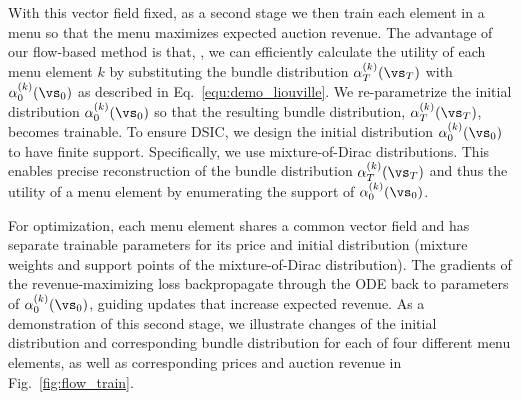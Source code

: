 With this vector field fixed, as a second stage we then train each element in a menu so that the menu maximizes expected auction revenue.  The advantage of our flow-based method is that, , we can efficiently calculate the utility of each menu element $k$ by substituting the bundle distribution $\alpha_T^{(k)}(\vs_T)$ with $\alpha_0^{(k)}(\vs_0)$ as described in Eq.~\ref{equ:demo_liouville}.
We re-parametrize the initial distribution $\alpha_0^{(k)}(\vs_0)$ so that the resulting bundle distribution, $\alpha_T^{(k)}(\vs_T)$, becomes trainable.
To ensure DSIC, we design the initial distribution $\alpha^{(k)}_0(\vs_0)$ to have finite support. Specifically, we use mixture-of-Dirac distributions.
This enables precise reconstruction of the bundle distribution $\alpha_T^{(k)}(\vs_T)$ and thus the utility of a menu element by enumerating the support of $\alpha_0^{(k)}(\vs_0)$.

For optimization, each menu element shares a common vector field and has separate trainable parameters for its price and  initial distribution (mixture weights and support points of the mixture-of-Dirac distribution).  
The gradients of the revenue-maximizing loss backpropagate through the ODE back to parameters of $\alpha_0^{(k)}(\vs_0)$, guiding updates that increase expected revenue. 
As a demonstration of  this second stage, we illustrate changes of the initial distribution and corresponding bundle  distribution for each of four different menu elements, as well as corresponding prices and auction revenue in Fig.~\ref{fig:flow_train}. 


